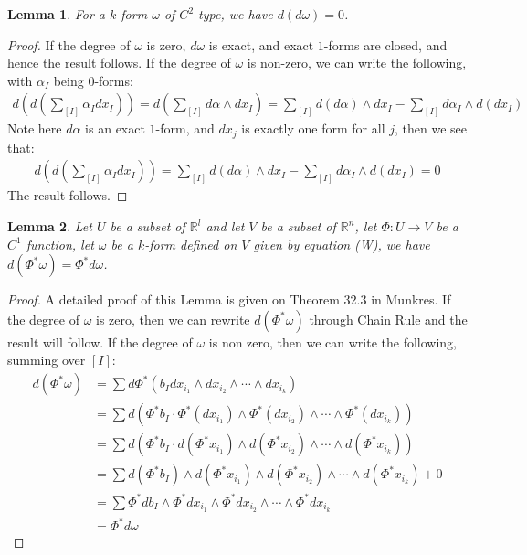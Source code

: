 \documentclass[15pt]{book}
\theoremstyle{break}
\theoremstyle{break}
\newtheorem{lem}{Lemma}[thm]
\newcommand{\R}{\mathbb{R}}
\begin{document}
\begin{lem}
For a $k$-form $\omega$ of $C^2$ type, we have $d(d\omega) = 0$.
\end{lem}
\begin{proof}
If the degree of $\omega$ is zero, $d\omega$ is exact, and exact $1$-forms are closed, and hence the result follows. If the degree of $\omega$ is non-zero, we can write the following, with $\alpha_I$ being $0$-forms:
\begin{align*}
d\left( d\left(\sum_{[I]} \alpha_I dx_I \right) \right) = d\left(\sum_{[I]} d\alpha \wedge dx_I\right) = \sum_{[I]} d(d \alpha) \wedge dx_I - \sum_{[I]} d\alpha_I \wedge d(d x_I)
\end{align*}
Note here $d\alpha$ is an exact $1$-form, and $dx_j$ is exactly one form for all $j$, then we see that:
\begin{align*}
d\left( d\left(\sum_{[I]} \alpha_I dx_I \right) \right) =\sum_{[I]} d(d \alpha) \wedge dx_I - \sum_{[I]} d\alpha_I \wedge d(d x_I) = 0
\end{align*}
The result follows.
\end{proof}
\hfill\break


\begin{lem}
Let $U$ be a subset of $\R^l$ and let $V$ be a subset of $\R^n$, let $\Phi:U \to V$ be a $C^1$ function, let $\omega$ be a $k$-form defined on $V$ given by equation (W), we have $d(\Phi^* \omega) = \Phi^* d\omega$.
\end{lem}
\begin{proof}
A detailed proof of this Lemma is given on Theorem 32.3 in Munkres. If the degree of $\omega$ is zero, then we can rewrite $d(\Phi^* \omega)$  through Chain Rule and the result will follow. If the degree of $\omega$ is non zero, then we can write the following, summing over $[I]$:
\begin{align*}
d(\Phi^* \omega) &= \sum d\Phi^*(b_I dx_{i_1}\wedge dx_{i_2}\wedge \cdots \wedge dx_{i_k})\\
&= \sum d\left(\Phi^*b_I \cdot \Phi^*(dx_{i_1})\wedge \Phi^*(dx_{i_2})\wedge \cdots \wedge \Phi^*(dx_{i_k}) \right)\\
&= \sum d(\Phi^*b_I \cdot d(\Phi^*x_{i_1}) \wedge d(\Phi^*x_{i_2})\wedge \cdots \wedge d(\Phi^*x_{i_k}) )\\
&= \sum d(\Phi^*b_I) \wedge d(\Phi^*x_{i_1}) \wedge d(\Phi^*x_{i_2}) \wedge \cdots \wedge d(\Phi^*x_{i_k}) +0 \\
&= \sum \Phi^*db_I \wedge \Phi^* dx_{i_1} \wedge \Phi^* dx_{i_2} \wedge \cdots \wedge \Phi^* dx_{i_k}\\
&= \Phi^* d\omega
\end{align*}
\end{proof}
\end{document}
